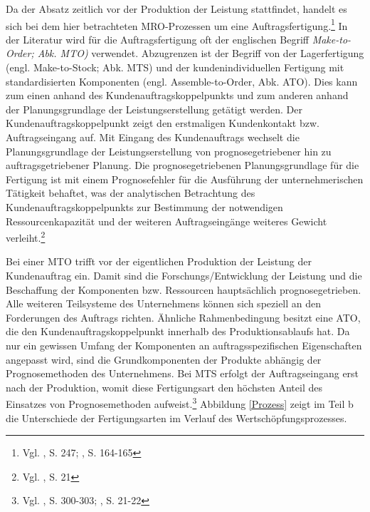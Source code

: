 Da der Absatz zeitlich vor der Produktion der Leistung stattfindet, handelt es sich bei dem hier betrachteten MRO-Prozessen um eine Auftragsfertigung.\footnote{Vgl. \cite{hax1956industriebetrieb}, S. 247; \cite{Gutenberg1965dispos}, S. 164-165} In der Literatur wird für die Auftragsfertigung oft der englischen Begriff \textit{Make-to-Order; Abk. MTO)} verwendet. Abzugrenzen ist der Begriff von der Lagerfertigung (engl. Make-to-Stock; Abk. MTS) und der kundenindividuellen Fertigung mit standardisierten Komponenten (engl. Assemble-to-Order, Abk. ATO). 
Dies kann zum einen anhand des Kundenauftragskoppelpunkts und zum anderen anhand der Planungsgrundlage der Leistungserstellung getätigt werden. Der Kundenauftragskoppelpunkt zeigt den erstmaligen Kundenkontakt bzw. Auftragseingang auf. Mit Eingang des Kundenauftrags wechselt die Planungsgrundlage der Leistungserstellung von prognosegetriebener hin zu auftragsgetriebener Planung. Die prognosegetriebenen Planungsgrundlage für die Fertigung ist mit einem Prognosefehler für die Ausführung der unternehmerischen Tätigkeit behaftet, was der analytischen Betrachtung des Kundenauftragskoppelpunkts zur Bestimmung der notwendigen Ressourcenkapazität und der weiteren Auftragseingänge weiteres Gewicht verleiht.\footnote{Vgl. \cite{quante2009management}, S. 21} 

Bei einer MTO trifft vor der eigentlichen Produktion der Leistung der Kundenauftrag ein. Damit sind die Forschungs/Entwicklung der Leistung und die Beschaffung der Komponenten bzw. Ressourcen hauptsächlich prognosegetrieben. Alle weiteren Teilsysteme des Unternehmens können sich speziell an den Forderungen des Auftrags richten. Ähnliche Rahmenbedingung besitzt eine ATO, die den Kundenauftragskoppelpunkt innerhalb des Produktionsablaufs hat. Da nur ein gewissen Umfang der Komponenten an auftragsspezifischen Eigenschaften angepasst wird, sind die Grundkomponenten der Produkte abhängig der Prognosemethoden des Unternehmens. Bei MTS erfolgt der Auftragseingang erst nach der Produktion, womit diese Fertigungsart den höchsten Anteil des Einsatzes von Prognosemethoden aufweist.\footnote{Vgl. \cite{fleischmeyr2004codp}, S. 300-303; \cite{quante2009management}, S. 21-22} Abbildung \ref{Prozess} zeigt im Teil b die Unterschiede der Fertigungsarten im Verlauf des Wertschöpfungsprozesses. 

